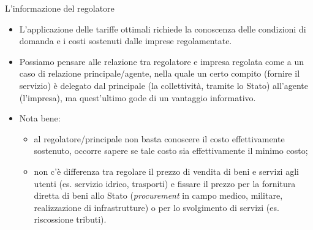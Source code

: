 \documentclass[aspectratio=64,12pt]{beamer}
\begin{document}
\begin{frame}{L'informazione del regolatore}
\begin{itemize}
\item L'applicazione delle tariffe ottimali richiede la conoscenza delle
condizioni di domanda e i costi sostenuti dalle imprese regolamentate.
\item Possiamo pensare alle relazione tra regolatore e impresa regolata come a un
caso di relazione \alert{principale/agente}, nella quale un certo compito (fornire
il servizio) è delegato dal principale (la collettività, tramite lo Stato)
all'agente (l'impresa), ma quest'ultimo gode di un vantaggio informativo.
\item Nota bene:
\begin{itemize}
\item al regolatore/principale non basta conoscere il costo effettivamente
  sostenuto, occorre sapere se tale costo sia effettivamente il \alert{minimo
    costo};
\item non c'è differenza tra regolare il prezzo di vendita di beni e servizi agli utenti
(es. servizio idrico, trasporti) e fissare il prezzo per la fornitura diretta di beni allo Stato
(\emph{procurement} in campo medico, militare, realizzazione di infrastrutture) o
per lo svolgimento di servizi (es. riscossione tributi).
\end{itemize}
\end{itemize}
\end{frame}
\end{document}
